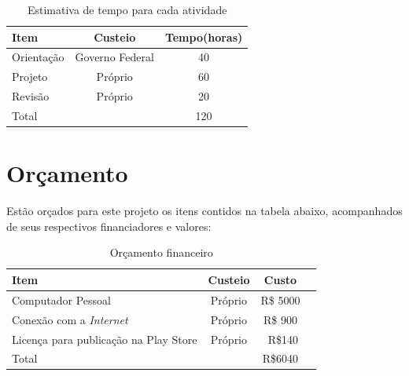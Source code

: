 \documentclass[
	12pt,				    %
	openright,			    %
	oneside,			    %
	a4paper,			    %
    sumario=tradicional,    %
	english,			    %
	brazil,				    %
	]{abntex2}              %
\begin{document}
\par

\begin{table}[htpb]
	\centering
	\caption[Cronograma em horas]{Estimativa de tempo para cada atividade}
	\label{tab:cronogramaHoras}
	\begin{tabular}{lcc}
	\toprule
		\textbf{Item} & \textbf{Custeio} & \textbf{Tempo(horas)} \\
	\midrule
		Orientação & Governo Federal & 40 \\
		Projeto & Próprio & 60 \\
		Revisão & Próprio & 20 \\
	\bottomrule
		Total & & 120
	\end{tabular}
\end{table}

\chapter{Orçamento}\label{sec:orcamento}

Estão orçados para este projeto os itens contidos na tabela abaixo, acompanhados de  seus respectivos financiadores e valores:

\par

\begin{table}[htpb]
	\centering
		\caption[Orçamento]{Orçamento financeiro}
		\label{tab:orcamento}
		\begin{tabular}{lccc}
		\toprule
		\textbf{Item} & \textbf{Custeio} & \textbf{Custo} \\
		\midrule
			Computador Pessoal & Próprio & R\$ 5000  \\
			Conexão com a \textit{Internet} & Próprio & R\$ 900 \\
			Licença para publicação na Play Store & Próprio & ~R\$140 \\
		\bottomrule
			Total & & R\$6040 \\
		\end{tabular}%
\end{table}%


        \postextual
\end{document}
